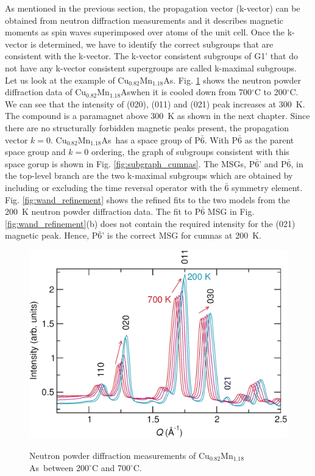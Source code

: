 \documentclass[10pt,doublespacing,edeposit]{uiucthesis2020}
\newcommand*{\cumnas}{Cu$_{0.82}$Mn$_{1.18}$As}
\begin{document}
\begin{mainmatter}

As mentioned in the previous section, the propagation vector (k-vector) can be obtained from neutron diffraction measurements and it describes magnetic moments as spin waves superimposed over atoms of the unit cell. Once the k-vector is determined, we have to identify the correct subgroups that are consistent with the k-vector. The k-vector consistent subgroups of G1' that do not have any k-vector consistent supergroups are called k-maximal subgroups. Let us look at the example of \cumnas. Fig. \ref{fig:WAND_data} shows the neutron powder diffraction data of \cumnas when it is cooled down from 700$^\circ$C to 200$^\circ$C. We can see that the intensity of (020), (011) and (021) peak increases at 300~K. The compound is a paramagnet above 300~K as shown in the next chapter. Since there are no structurally forbidden magnetic peaks present, the propagation vector $k = 0$. \cumnas\ has a space group of P$\bar{6}$. With P$\bar{6}$ as the parent space group and $k = 0$ ordering, the graph of subgroups consistent with this space gorup is shown in Fig. \ref{fig:subgraph_cumnas}. The MSGs, P$\bar{6}$' and P$\bar{6}$, in the top-level branch are the two k-maximal subgroups which are obtained by including or excluding the time reversal operator with the $\bar{6}$ symmetry element. Fig. \ref{fig:wand_refinement} shows the refined fits to the two models from the 200~K neutron powder diffraction data. The fit to P$\bar{6}$ MSG in Fig. \ref{fig:wand_refinement}(b) does not contain the required intensity for the (021) magnetic peak. Hence, P$\bar{6}$' is the correct MSG for cumnas at 200~K.

\begin{figure}
\centering\includegraphics[width=0.7\columnwidth]{figures/ch4/WAND_data.png} \\
\caption{\label{fig:WAND_data}
Neutron powder diffraction measurements of \cumnas\ between 200$^\circ$C and 700$^\circ$C.
}
\end{figure}



\end{mainmatter}
\end{document}
